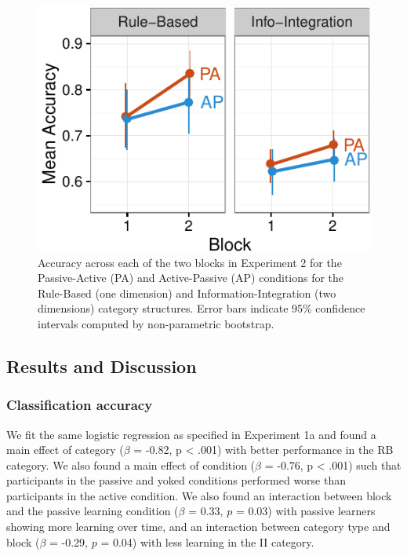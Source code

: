 \documentclass[10pt, letterpaper]{article}
\newenvironment{CodeChunk}{}{}
\begin{document}
\begin{CodeChunk}
\begin{figure}[h]

\includegraphics{figs/exp2_acc_plot-1} \hfill{}

\caption[Accuracy across each of the two blocks in Experiment 2 for the Passive-Active (PA) and Active-Passive (AP) conditions for the Rule-Based (one dimension) and Information-Integration (two dimensions) category structures]{Accuracy across each of the two blocks in Experiment 2 for the Passive-Active (PA) and Active-Passive (AP) conditions for the Rule-Based (one dimension) and Information-Integration (two dimensions) category structures. Error bars indicate 95\% confidence intervals computed by non-parametric bootstrap.}\label{fig:exp2_acc_plot}
\end{figure}
\end{CodeChunk}

\subsection{Results and Discussion}\label{results-and-discussion-1}

\subsubsection{Classification accuracy}\label{classification-accuracy-1}

We fit the same logistic regression as specified in Experiment 1a and
found a main effect of category (\(\beta\) = -0.82, p \textless{} .001)
with better performance in the RB category. We also found a main effect
of condition (\(\beta\) = -0.76, p \textless{} .001) such that
participants in the passive and yoked conditions performed worse than
participants in the active condition. We also found an interaction
between block and the passive learning condition (\(\beta\) = 0.33,
\(p\) = 0.03) with passive learners showing more learning over time, and
an interaction between category type and block (\(\beta\) = -0.29, \(p\)
= 0.04) with less learning in the II category.
\end{document}
